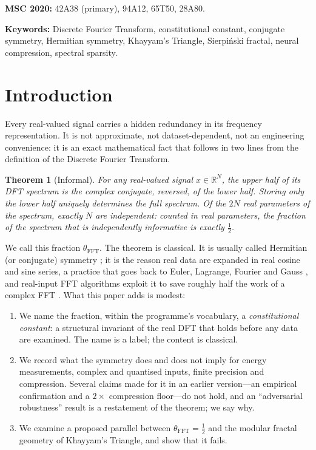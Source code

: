 \documentclass[12pt]{article}
\newtheorem{theorem}{Theorem}[section]
\theoremstyle{definition}
\newcommand{\R}{\mathbb{R}}
\newcommand{\thetaFFT}{\theta_{\mathrm{FFT}}}
\begin{document}
\medskip
\textbf{MSC 2020:} 42A38 (primary), 94A12, 65T50, 28A80.

\medskip
\textbf{Keywords:} Discrete Fourier Transform, constitutional constant,
conjugate symmetry, Hermitian symmetry, Khayyam's Triangle,
Sierpi\'nski fractal, neural compression, spectral sparsity.

\tableofcontents
\newpage

\section{Introduction}

Every real-valued signal carries a hidden redundancy in its
frequency representation.  It is not approximate, not
dataset-dependent, not an engineering convenience: it is an exact
mathematical fact that follows in two lines from the definition of
the Discrete Fourier Transform.

\begin{theorem}[Informal]\label{thm:informal}
For any real-valued signal $x \in \R^N$, the upper half of its DFT
spectrum is the complex conjugate, reversed, of the lower half.
Storing only the lower half uniquely determines the full spectrum.
Of the $2N$ real parameters of the spectrum, exactly $N$ are
independent: counted in real parameters, the fraction of the spectrum
that is \emph{independently informative} is exactly $\tfrac{1}{2}$.
\end{theorem}

We call this fraction $\thetaFFT$.  The theorem is classical.  It is
usually called Hermitian (or conjugate) symmetry \cite{OppenheimSchafer2010};
it is the reason real data are expanded in real cosine and sine series,
a practice that goes back to Euler, Lagrange, Fourier and Gauss
\cite{Heideman1984}, and real-input FFT algorithms
\cite{CooleyLewisWelch1970,Sorensen1987} exploit it to save roughly half
the work of a complex FFT \cite{Cooley1965}.
What this paper adds is modest:

\begin{enumerate}[noitemsep]
  \item We name the fraction, within the programme's vocabulary, a
        \emph{constitutional constant}: a structural invariant of the
        real DFT that holds before any data are examined.  The name is
        a label; the content is classical.
  \item We record what the symmetry does and does not imply for energy
        measurements, complex and quantised inputs, finite precision
        and compression.  Several claims made for it in an earlier
        version---an empirical confirmation and a $2\times$ compression
        floor---do not hold, and an ``adversarial robustness'' result is
        a restatement of the theorem; we say why.
  \item We examine a proposed parallel between $\thetaFFT = \tfrac{1}{2}$
        and the modular fractal geometry of Khayyam's Triangle, and show
        that it fails.
\end{enumerate}
\end{document}

